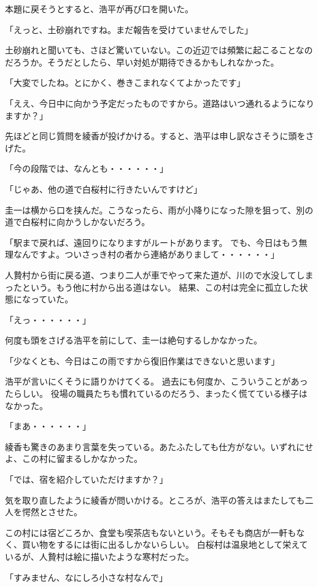 ﻿\documentclass[book,tate]{jlreq}
\begin{document}
本題に戻そうとすると、浩平が再び口を開いた。

「えっと、土砂崩れですね。まだ報告を受けていませんでした」

土砂崩れと聞いても、さほど驚いていない。この近辺では頻繁に起こることなのだろうか。そうだとしたら、早い対処が期待できるかもしれなかった。

「大変でしたね。とにかく、巻きこまれなくてよかったです」

「ええ、今日中に向かう予定だったものですから。道路はいつ通れるようになりますか？」

先ほどと同じ質問を綾香が投げかける。すると、浩平は申し訳なさそうに頭をさげた。

「今の段階では、なんとも・・・・・・」

「じゃあ、他の道で白桜村に行きたいんですけど」

圭一は横から口を挟んだ。こうなったら、雨が小降りになった隙を狙って、別の道で白桜村に向かうしかないだろう。

「駅まで戻れば、遠回りになりますがルートがあります。
でも、今日はもう無理なんですよ。ついさっき村の者から連絡がありまして・・・・・・」

人贄村から街に戻る道、つまり二人が車でやって来た道が、川ので水没してしまったという。もう他に村から出る道はない。
結果、この村は完全に孤立した状態になっていた。

「えっ・・・・・・」

何度も頭をさげる浩平を前にして、圭一は絶句するしかなかった。

「少なくとも、今日はこの雨ですから復旧作業はできないと思います」

浩平が言いにくそうに語りかけてくる。 過去にも何度か、こういうことがあったらしい。
役場の職員たちも慣れているのだろう、まったく慌てている様子はなかった。

「まあ・・・・・・」

綾香も驚きのあまり言葉を失っている。あたふたしても仕方がない。いずれにせよ、この村に留まるしかなかった。

「では、宿を紹介していただけますか？」

気を取り直したように綾香が問いかける。ところが、浩平の答えはまたしても二人を愕然とさせた。

この村には宿どころか、食堂も喫茶店もないという。そもそも商店が一軒もなく、買い物をするには街に出るしかないらしい。
白桜村は温泉地として栄えているが、人贄村は絵に描いたような寒村だった。

「すみません、なにしろ小さな村なんで」
\end{document}
